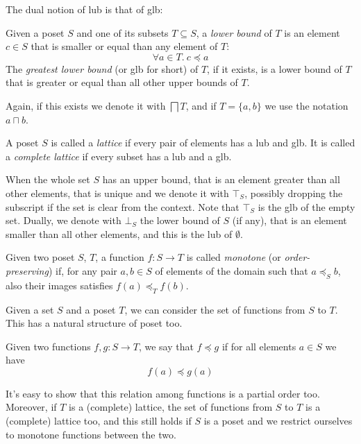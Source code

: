 The dual notion of lub is that of glb:
\begin{definition}
	Given a poset $S$ and one of its subsets $T \subseteq S$, a \textit{lower bound} of $T$ is an element $c \in S$ that is smaller or equal than any element of $T$:
	\[
	\forall a \in T.\ c \preceq a
	\]
	The \textit{greatest lower bound} (or glb for short) of $T$, if it exists, is a lower bound of $T$ that is greater or equal than all other upper bounds of $T$.
\end{definition}
Again, if this exists we denote it with $\bigsqcap T$, and if $T = \{ a, b \}$ we use the notation $a \sqcap b$.

\begin{definition}[Lattice]
	A poset $S$ is called a \textit{lattice} if every pair of elements has a lub and glb. It is called a \textit{complete lattice} if every subset has a lub and a glb.
\end{definition}

When the whole set $S$ has an upper bound, that is an element greater than all other elements, that is unique and we denote it with $\top_S$, possibly dropping the subscript if the set is clear from the context. Note that $\top_S$ is the glb of the empty set. Dually, we denote with $\bot_S$ the lower bound of $S$ (if any), that is an element smaller than all other elements, and this is the lub of $\emptyset$.

\begin{definition}
	Given two poset $S$, $T$, a function $f : S \rightarrow T$ is called \textit{monotone} (or \textit{order-preserving}) if, for any pair $a, b \in S$ of elements of the domain such that $a \preceq_S b$, also their images satisfies $f(a) \preceq_T f(b)$.
\end{definition}

Given a set $S$ and a poset $T$, we can consider the set of functions from $S$ to $T$. This has a natural structure of poset too.
\begin{definition}
	Given two functions $f, g: S \rightarrow T$, we say that $f \preceq g$ if for all elements $a \in S$ we have
	\[
	f(a) \preceq g(a)
	\]
\end{definition}
It's easy to show that this relation among functions is a partial order too. Moreover, if $T$ is a (complete) lattice, the set of functions from $S$ to $T$ is a (complete) lattice too, and this still holds if $S$ is a poset and we restrict ourselves to monotone functions between the two.

